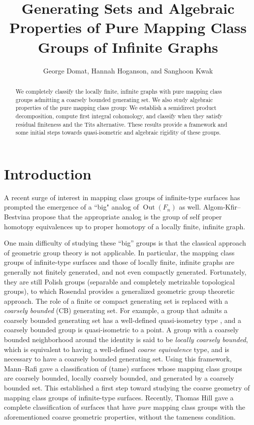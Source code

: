 \documentclass[11pt]{amsart}
\title[Generating Sets and Algebraic Properties of $\PMap(\G)$]{Generating Sets and Algebraic Properties of Pure Mapping Class Groups of Infinite Graphs}
\author{George Domat, Hannah Hoganson, and Sanghoon Kwak}
\date{}
\theoremstyle{plain}
\theoremstyle{definition}
\DeclareMathOperator{\Out}{Out}
\newcommand{\<}{\langle}
\renewcommand{\>}{\rangle}
\begin{document}
\maketitle 
\begin{abstract}
    We completely classify the locally finite, infinite graphs with pure mapping class groups admitting a coarsely bounded generating set. We also study algebraic properties of the pure mapping class group: We establish a semidirect product decomposition, compute first integral cohomology, and classify when they satisfy residual finiteness and the Tits alternative. These results provide a framework and some initial steps towards quasi-isometric and algebraic rigidity of these groups.
\end{abstract} 


\section{Introduction}\label{sec:intro}
A recent surge of interest in mapping class groups of infinite-type surfaces has prompted the emergence of a ``big" analog of $\Out(F_{n})$ as well. Algom-Kfir--Bestvina \cite{AB2021} propose that the appropriate analog is the group of self proper homotopy equivalences up to proper homotopy of a locally finite, infinite graph. 

One main difficulty of studying these ``big'' groups is that the classical approach of geometric group theory is not applicable. In particular, the mapping class groups of infinite-type surfaces and those of locally finite, infinite graphs are generally not finitely generated, and not even compactly generated. Fortunately, they are still Polish groups (separable and completely metrizable topological groups), to which Rosendal provides a generalized geometric group theoretic approach. The role of a finite or compact generating set is replaced with a \emph{coarsely bounded} (CB) generating set. For example, a group that admits a coarsely bounded generating set has a well-defined quasi-isometry type \cite[Theorem 1.2 and Proposition 2.72]{rosendal2022}, and a coarsely bounded group is quasi-isometric to a point. A group with a coarsely bounded neighborhood around the identity is said to be \emph{locally coarsely bounded}, which is equivalent to having a well-defined \emph{coarse equivalence} type, and is necessary to have a coarsely bounded generating set.
Using this framework, Mann--Rafi \cite{mann2023large} gave a classification of (tame) surfaces whose mapping class groups are coarsely bounded, locally coarsely bounded, and generated by a coarsely bounded set. This established a first step toward studying the coarse geometry of mapping class groups of infinite-type surfaces. Recently, Thomas Hill \cite{hill2023largescale} gave a complete classification of surfaces that have \emph{pure} mapping class groups with the aforementioned coarse geometric properties, without the tameness condition.
\end{document}
